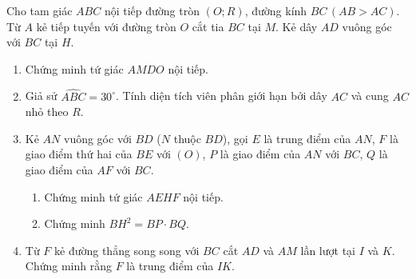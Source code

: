 \begin{ex}%
Cho tam giác $ABC$ nội tiếp đường tròn $(O;R)$, đường kính $BC\,(AB>AC).$ Từ $A$ kẻ tiếp tuyến với đường tròn $O$ cắt tia $BC$ tại $M$. Kẻ dây $AD$ vuông góc với $BC$ tại $H$.
\begin{enumerate}
\item Chứng minh tứ giác $AMDO$ nội tiếp.
\item Giả sử $\widehat{ABC}=30^{\circ}$. Tính diện tích viên phân giới hạn bởi dây $AC$ và cung $AC$ nhỏ theo $R$.
\item Kẻ $AN$ vuông góc với $BD$ ($N$ thuộc $BD$), gọi $E$ là trung điểm của $AN$, $F$ là giao điểm thứ hai của $BE$ với $(O)$, $P$ là giao điểm của $AN$ với $BC$, $Q$ là giao điểm của $AF$ với $BC$.
	\begin{enumerate}
	\item Chứng minh tứ giác $AEHF$ nội tiếp.
	\item Chứng minh $BH^2=BP \cdot BQ$.
	\end{enumerate}
\item Từ $F$ kẻ đường thẳng song song với $BC$ cắt $AD$ và $AM$ lần lượt tại  $I$ và $K$. Chứng minh rằng $F$ là trung điểm của $IK$.
\end{enumerate}
\end{ex}
